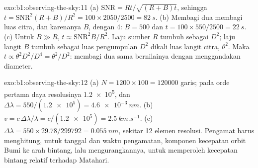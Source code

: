 \begin{solution}{exo:b1:observing-the-sky:11}
(a) $\mathrm{SNR} = Rt/\sqrt{(R + B)t}$, sehingga $t = \mathrm{SNR}^2(R + B)/R^2
= 100\times2050/2500 = \qty{82}{s}$. (b) Membagi dua  membagi
luas citra, dan karenanya $B$, dengan 4: $B = 500$ dan $t = 100\times550/2500 =
\qty{22}{s}$. (c) Untuk $B \gg R$, $t \approx \mathrm{SNR}^2B/R^2$. Laju sumber
$R$ tumbuh sebagai $D^2$; laju langit $B$ tumbuh sebagai luas pengumpulan
$D^2$ dikali luas langit citra, $\theta^2$. Maka $t \propto
\theta^2D^2/D^4 = \theta^2/D^2$: membagi dua  sama bernilainya dengan menggandakan diameter.
\end{solution}

\begin{solution}{exo:b1:observing-the-sky:12}
(a) $N = 1200\times100 = \num{120000}$ garis; pada orde pertama daya resolusinya
\num{1.2e5}, dan $\Delta\lambda = 550/(\num{1.2e5}) =
\qty{4.6e-3}{nm}$. (b) $v = c\,\Delta\lambda/\lambda = c/(\num{1.2e5}) =
\qty{2.5}{km.s^{-1}}$. (c) $\Delta\lambda = 550\times29.78/\num{299792} =
\qty{0.055}{nm}$, sekitar 12 elemen resolusi. Pengamat harus menghitung, untuk tanggal dan waktu pengamatan, komponen kecepatan orbit Bumi ke arah bintang, lalu mengurangkannya, untuk memperoleh kecepatan bintang relatif terhadap Matahari.
\end{solution}

